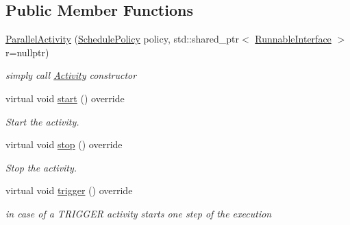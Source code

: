 \subsection*{Public Member Functions}
\begin{DoxyCompactItemize}
\item 
\hypertarget{classcoco_1_1_parallel_activity_ab3446f590315a0d5ba42fb84bff6641f}{\hyperlink{classcoco_1_1_parallel_activity_ab3446f590315a0d5ba42fb84bff6641f}{Parallel\-Activity} (\hyperlink{structcoco_1_1_schedule_policy}{Schedule\-Policy} policy, std\-::shared\-\_\-ptr$<$ \hyperlink{classcoco_1_1_runnable_interface}{Runnable\-Interface} $>$ r=nullptr)}\label{classcoco_1_1_parallel_activity_ab3446f590315a0d5ba42fb84bff6641f}

\begin{DoxyCompactList}\small\item\em simply call \hyperlink{classcoco_1_1_activity}{Activity} constructor \end{DoxyCompactList}\item 
\hypertarget{classcoco_1_1_parallel_activity_aa642be0f3fd844cfced97cabadd59dfe}{virtual void \hyperlink{classcoco_1_1_parallel_activity_aa642be0f3fd844cfced97cabadd59dfe}{start} () override}\label{classcoco_1_1_parallel_activity_aa642be0f3fd844cfced97cabadd59dfe}

\begin{DoxyCompactList}\small\item\em Start the activity. \end{DoxyCompactList}\item 
\hypertarget{classcoco_1_1_parallel_activity_a32e121790e325add143e5f9411ac75a4}{virtual void \hyperlink{classcoco_1_1_parallel_activity_a32e121790e325add143e5f9411ac75a4}{stop} () override}\label{classcoco_1_1_parallel_activity_a32e121790e325add143e5f9411ac75a4}

\begin{DoxyCompactList}\small\item\em Stop the activity. \end{DoxyCompactList}\item 
\hypertarget{classcoco_1_1_parallel_activity_a6d5004facadbbae85c5e98979dc1e301}{virtual void \hyperlink{classcoco_1_1_parallel_activity_a6d5004facadbbae85c5e98979dc1e301}{trigger} () override}\label{classcoco_1_1_parallel_activity_a6d5004facadbbae85c5e98979dc1e301}

\begin{DoxyCompactList}\small\item\em in case of a T\-R\-I\-G\-G\-E\-R activity starts one step of the execution \end{DoxyCompactList}\end{DoxyCompactItemize}
